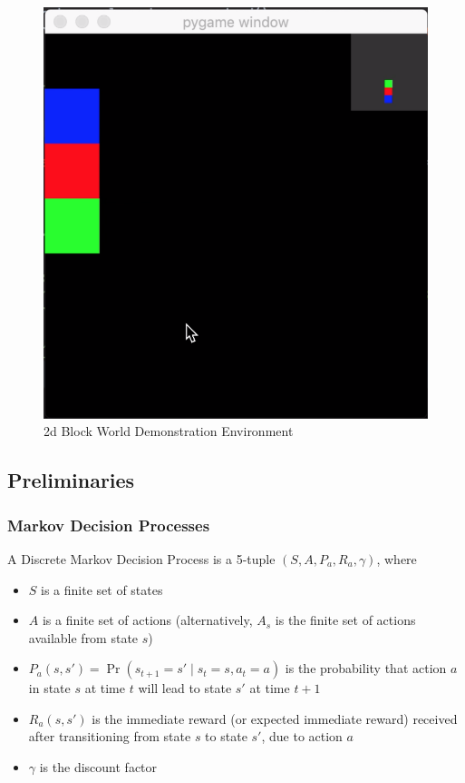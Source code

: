 \documentclass[letterpaper, 12 pt, conference]{ieeeconf}
\begin{document}
\begin{figure}[thpb]
  \centering
  \includegraphics[scale=0.5]{blockworld.png}
  \caption{2d Block World Demonstration Environment}
  \label{figurelabel}
\end{figure}

\subsection{Preliminaries}
\subsubsection{Markov Decision Processes }
A Discrete Markov Decision Process is a 5-tuple $(S, A, P_a, R_a, \gamma)$, where
\begin{itemize}
    \item $S$ is a finite set of states
    \item $A$ is a finite set of actions (alternatively, $A_{s}$ is the finite set of actions available from state $s$)
    \item $P_{a}(s,s')=\Pr(s_{t+1}=s'\mid s_{t}=s,a_{t}=a)$ is the probability that action $a$ in state $s$ at time $t$ will lead to state $s'$ at time $t+1$
    \item $R_{a}(s,s')$ is the immediate reward (or expected immediate reward) received after transitioning from state $s$ to state $s'$, due to action $a$
    \item$\gamma$ is the discount factor
\end{itemize}
\end{document}
